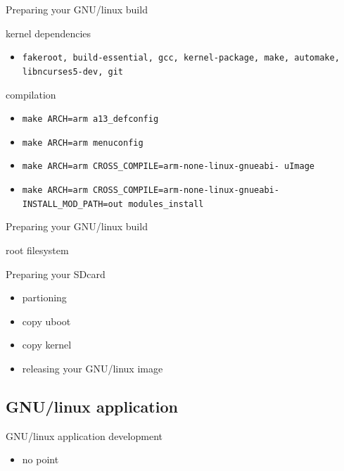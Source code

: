\documentclass{beamer}
\begin{document}
 
 \begin{frame}{Preparing your GNU/linux build}
   \begin{block}{kernel dependencies}
     \begin{itemize}
     \item {\tt fakeroot, build-essential, gcc, kernel-package, make,
       automake, libncurses5-dev, git}
     \end{itemize} 
   \end{block}

   \begin{block}{compilation}
     \begin{itemize}
     \item {\tt make ARCH=arm a13\_defconfig}
     \item {\tt make ARCH=arm menuconfig}
     \item {\tt make ARCH=arm CROSS\_COMPILE=arm-none-linux-gnueabi-
       uImage}
     \item {\tt make ARCH=arm CROSS\_COMPILE=arm-none-linux-gnueabi-
       INSTALL\_MOD\_PATH=out modules\_install}
     \end{itemize} 
   \end{block}
 \end{frame}

 \begin{frame}{Preparing your GNU/linux build}
   \begin{block}{root filesystem}
   \end{block} 

   \begin{block}{Preparing your SDcard}
     \begin{itemize}
     \item partioning
     \item copy uboot
     \item copy kernel
     \item releasing your GNU/linux image
     \end{itemize}
   \end{block}
 \end{frame}
  
 \subsection{GNU/linux application}
 \begin{frame}{GNU/linux application development}
   \begin{block}{}
     \begin{itemize}
     \item no point
     \end{itemize}
   \end{block}
 \end{frame}
\end{document}
